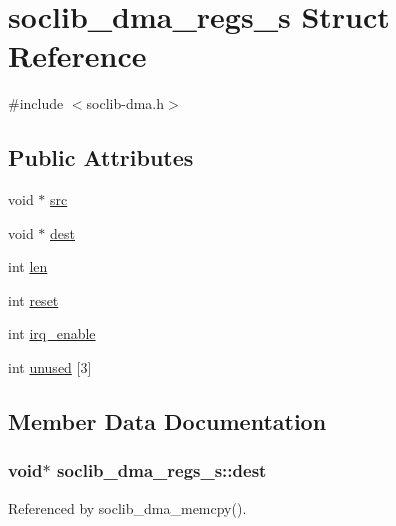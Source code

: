 \hypertarget{structsoclib__dma__regs__s}{\section{soclib\-\_\-dma\-\_\-regs\-\_\-s Struct Reference}
\label{structsoclib__dma__regs__s}
}


{\ttfamily \#include $<$soclib-\/dma.\-h$>$}

\subsection*{Public Attributes}
\begin{DoxyCompactItemize}
\item 
void $\ast$ \hyperlink{structsoclib__dma__regs__s_a5e158dc8ad7e09c37a6520c04c3ce797}{src}
\item 
void $\ast$ \hyperlink{structsoclib__dma__regs__s_aeaf5851499b0b6f4cc4352b30b25f288}{dest}
\item 
int \hyperlink{structsoclib__dma__regs__s_a878b0eea0f115a1978a9adb5f3baa24b}{len}
\item 
int \hyperlink{structsoclib__dma__regs__s_a978b3aef4d9a69ea2c489657d239180a}{reset}
\item 
int \hyperlink{structsoclib__dma__regs__s_a59ab85953a7860ed2e63ce90052ffdb3}{irq\-\_\-enable}
\item 
int \hyperlink{structsoclib__dma__regs__s_a402da684971c594fccc19d816236524a}{unused} \mbox{[}3\mbox{]}
\end{DoxyCompactItemize}


\subsection{Member Data Documentation}
\hypertarget{structsoclib__dma__regs__s_aeaf5851499b0b6f4cc4352b30b25f288}{
\subsubsection[{dest}]{\setlength{\rightskip}{0pt plus 5cm}void$\ast$ soclib\-\_\-dma\-\_\-regs\-\_\-s\-::dest}}\label{structsoclib__dma__regs__s_aeaf5851499b0b6f4cc4352b30b25f288}


Referenced by soclib\-\_\-dma\-\_\-memcpy().

